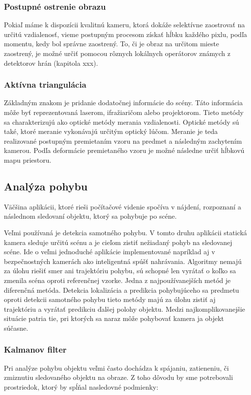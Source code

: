 \subsubsection{Postupné ostrenie obrazu }
Pokiaľ máme k dispozícii kvalitnú kameru, ktorá dokáže selektívne zaostrovať na určitú vzdialenosť, vieme postupným procesom získať hĺbku každého pixlu, podľa momentu, kedy bol správne zaostrený. To, či je obraz na určitom mieste zaostrený, je možné určiť pomocou rôznych lokálnych operátorov známych z detektorov hrán (kapitola xxx). 


\subsubsection{Aktívna triangulácia }
\label{sec:activeDeep}
Základným znakom je pridanie dodatočnej informácie do scény. Táto informácia môže byť reprezentovaná laserom, ifražiaričom alebo projektorom. Tieto metódy sa charakterizujú ako optické metódy merania vzdialenosti. Optické metódy sú také, ktoré meranie vykonávajú určitým optický lúčom.  Meranie je teda realizované postupným premietaním vzoru na predmet a následným zachytením kamerou. Podľa deformácie premietaného vzoru je možné následne určiť hĺbkovú mapu priestoru.

\subsection{Analýza pohybu }
Väčšina aplikácii, ktoré rieši počítačové videnie spočíva v nájdení, rozpoznaní a následnom sledovaní objektu, ktorý sa pohybuje po scéne. 

Veľmi používaná je detekcia samotného pohybu. V tomto druhu aplikácii statická kamera sleduje určitú scénu a je cieľom zistiť nežiadaný pohyb na sledovanej scéne. Ide o veľmi jednoduché aplikácie implementované napríklad aj v bezpečnostných kamerách ako inteligentná spúšť nahrávania.  Algoritmy nemajú za úlohu riešiť smer ani trajektóriu pohybu, sú schopné len vyrátať o koľko sa zmenila scéna oproti referenčnej vzorke. Jedna z najpoužívanejších metód je diferenčná metóda. Detekcia lokalizácia a predikcia pohybujúceho sa predmetu oproti detekcii samotného pohybu tieto metódy majú  za úlohu zistiť aj trajektóriu a vyrátať predikciu ďalšej polohy objektu. Medzi najkomplikovanejšie situácie patria tie, pri ktorých sa naraz môže pohybovať kamera ja objekt súčasne.

\subsubsection{Kalmanov filter}
Pri analýze pohybu objektu veľmi často dochádza k spájaniu, zatieneniu, či zmiznutiu sledovaného  objektu na obraze. Z toho dôvodu by sme potrebovali prostriedok, ktorý by spĺňal nasledovné podmienky: 


